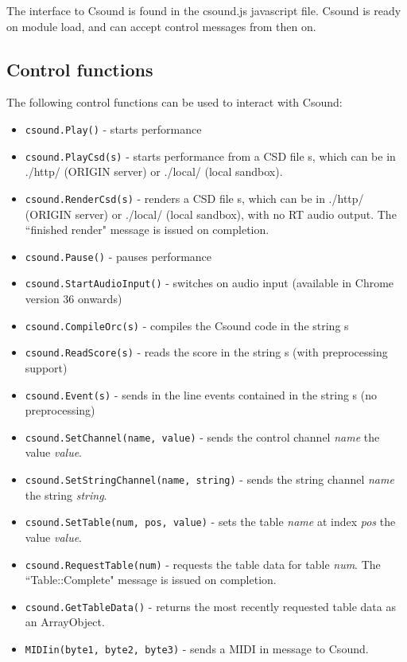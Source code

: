 \documentclass[11pt]{article}
\begin{document}
The interface to Csound is found in the csound.js javascript file. Csound is ready on module load, and can accept control messages
from then on.

\subsection{Control functions}

The following control functions can be used to interact with Csound:

\begin{itemize}
\item {\tt csound.Play()} - starts performance
\item {\tt csound.PlayCsd(s)} - starts performance from a CSD file s, which can be in ./http/ (ORIGIN server) or ./local/ (local sandbox).
\item {\tt csound.RenderCsd(s)} - renders a CSD file s, which can be in ./http/ (ORIGIN server) or ./local/ (local sandbox), with no RT audio output.
The ``finished render" message is issued on completion.
\item {\tt csound.Pause()} - pauses performance
\item  {\tt csound.StartAudioInput()} - switches on audio input
  (available in Chrome version 36 onwards)
\item {\tt csound.CompileOrc(s)} - compiles the Csound code in the string s
\item {\tt csound.ReadScore(s)} - reads the score in the string s (with preprocessing support)
\item {\tt csound.Event(s)} - sends in the line events contained in the string s (no preprocessing)
\item {\tt csound.SetChannel(name, value)} - sends the control channel
  \emph{name} the value \emph{value}.
\item {\tt csound.SetStringChannel(name, string)} - sends the string channel
  \emph{name} the string \emph{string}.
\item {\tt csound.SetTable(num, pos, value)} - sets the table
  \emph{name} at index \emph{pos} the value \emph{value}.
\item {\tt csound.RequestTable(num)} - requests the table data for
  table \emph{num}. The ``Table::Complete" message is issued on completion. 
\item {\tt csound.GetTableData()} - returns the most recently
  requested table data as an ArrayObject. 
\item {\tt MIDIin(byte1, byte2, byte3)} - sends a MIDI in message to Csound.

\end{itemize}
\end{document}

